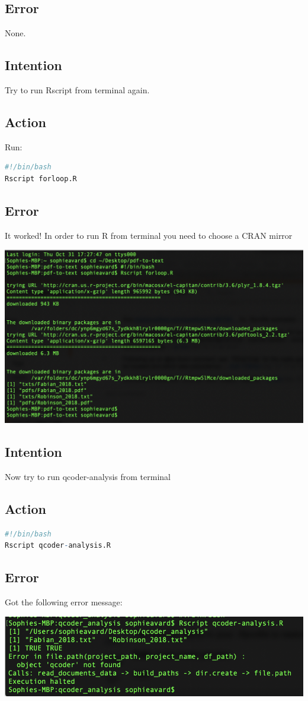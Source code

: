 \documentclass{article}
\begin{document}
\subsection{Error}
None.

\subsection{Intention}
Try to run Rscript from terminal again.

\subsection{Action}
Run: 
\begin{lstlisting}[language=R]
#!/bin/bash
Rscript forloop.R
\end{lstlisting}

\subsection{Error}
It worked! In order to run R from terminal you need to choose a CRAN mirror

\includegraphics[width=\textwidth]{forloop-terminal-command.png}

\subsection{Intention}
Now try to run qcoder-analysis from terminal 

\subsection{Action}
\begin{lstlisting}[language=R]
#!/bin/bash
Rscript qcoder-analysis.R
\end{lstlisting}

\subsection{Error}
Got the following error message:

\includegraphics[width=\textwidth]{qcoder-terminal-error.png}
\end{document}
